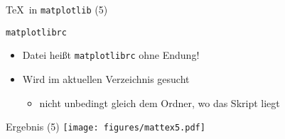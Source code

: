 \begin{frame}[fragile]{\TeX\ in \texttt{matplotlib} (5)}
\end{frame}

\begin{frame}[fragile]{\texttt{matplotlibrc}}
  \lstMatplotlibrcSettings
  

  \begin{itemize}
    \item Datei heißt \texttt{matplotlibrc} ohne Endung!
    \item Wird im aktuellen Verzeichnis gesucht
      \begin{itemize}
        \item nicht unbedingt gleich dem Ordner, wo das Skript liegt
      \end{itemize}
  \end{itemize}
\end{frame}

\AddToShipoutPictureFG*{\ShowFramePicture}
\begin{frame}{Ergebnis (5)}
  \centering
  \texttt{[image: figures/mattex5.pdf]}
\end{frame}
